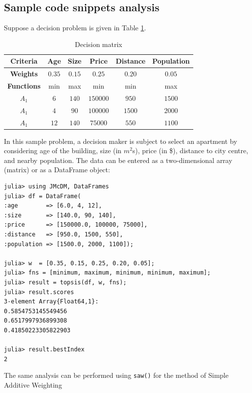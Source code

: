 \documentclass[authoryear,preprint,review,12pt]{elsarticle}
\begin{document}
\subsection{Sample code snippets analysis}
\label{section:sample_code}

Suppose a decision problem is given in Table \ref{table:example_problem}.

\begin{table}[H]
	\centering
	\begin{tabular}{|c|c|c|c|c|c|}
		\hline
		\textbf{Criteria} & {Age} & {Size} &  {Price} & {Distance} & {Population}\\
		\hline
		\textbf{Weights} & {$0.35$} & {$0.15$} & {$0.25$}& {$0.20$} & {$0.05$} \\
		\hline
		\textbf{Functions} & min  & max & min & min & max\\
		\hline
		\hline
		{$A_1$} & {$6$} & {$140$} & $150000$ & {$950$} & $1500$\\
		\hline
		{$A_1$} & {$4$} & {$90$} & $100000$ & {$1500$} & $2000$\\
		\hline
		{$A_1$} & {$12$} & {$140$} & $75000$ & {$550$} & $1100$\\
		\hline
	\end{tabular}
	\caption{Decision matrix}
	\label{table:example_problem} 
\end{table}

In this sample problem, a decision maker is subject to select an apartment by considering age of the building, size (in $m^2$s), price (in \$), distance to city centre, and nearby population.
The data can be entered as a two-dimensional array (matrix) or as a DataFrame object:

\begin{verbatim}
julia> using JMcDM, DataFrames
julia> df = DataFrame(
:age        => [6.0, 4, 12],
:size       => [140.0, 90, 140],
:price      => [150000.0, 100000, 75000],
:distance   => [950.0, 1500, 550],
:population => [1500.0, 2000, 1100]);

julia> w  = [0.35, 0.15, 0.25, 0.20, 0.05];
julia> fns = [minimum, maximum, minimum, minimum, maximum];
julia> result = topsis(df, w, fns);
julia> result.scores
3-element Array{Float64,1}:
0.5854753145549456
0.6517997936899308
0.41850223305822903

julia> result.bestIndex
2
\end{verbatim}

The same analysis can be performed using \texttt{saw()} for the method of Simple Additive Weighting
\end{document}
